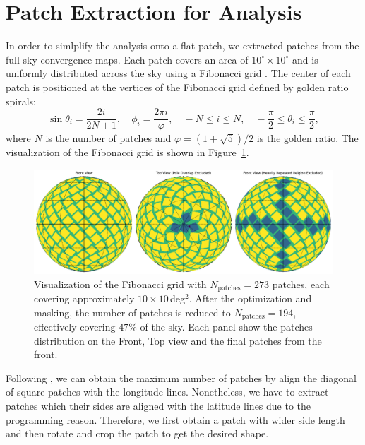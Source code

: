 \section{Patch Extraction for Analysis}
In order to simlplify the analysis onto a flat patch, we extracted patches from the full-sky convergence maps. Each patch covers an area of $10^\circ \times 10^\circ$ and is uniformly distributed across the sky using a Fibonacci grid \citep{2006QJRMS.132.1769S, 2023MNRAS.524.5591F}. The center of each patch is positioned at the vertices of the Fibonacci grid defined by golden ratio spirals:
\begin{equation}
    \sin \theta_i = \frac{2i}{2N + 1}, \quad \phi_i = \frac{2 \pi i}{\varphi}, \quad -N \leq i \leq N, \quad -\frac{\pi}{2} \leq \theta_i \leq \frac{\pi}{2},
\end{equation}
where $N$ is the number of patches and $\varphi = (1 + \sqrt{5})/2$ is the golden ratio. The visualization of the Fibonacci grid is shown in Figure~\ref{fig:fibonacci}.
\begin{figure}[ht]
    \centering
    \includegraphics[width=\textwidth]{figures/fibonacci_grid.png}
    \caption[Visualization of the Fibonacci grids]{Visualization of the Fibonacci grid with $N_{\text{patches}} = 273$ patches, each covering approximately $10 \times 10$\,deg$^2$. 
    After the optimization and masking, the number of patches is reduced to $N_{\text{patches}} = 194$, effectively covering $47 \%$ of the sky.
    Each panel show the patches distribution on the Front, Top view and the final patches from the front.}\label{fig:fibonacci}
\end{figure}

Following \citet{2023MNRAS.524.5591F}, we can obtain the maximum number of patches by align the diagonal of square patches with the longitude lines. Nonetheless, we have to extract patches which their sides are aligned with the latitude lines due to the programming reason. Therefore, we first obtain a patch with wider side length and then rotate and crop the patch to get the desired shape.


